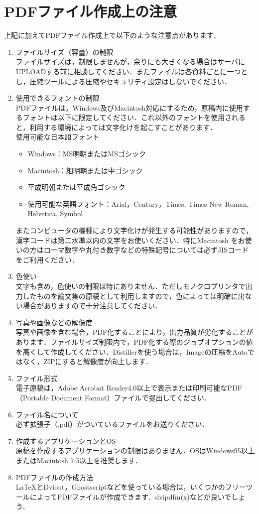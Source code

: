 \documentclass{jsarticle}
\begin{document}
\section{PDFファイル作成上の注意}
上記に加えてPDFファイル作成上で以下のような注意点があります．
\begin{enumerate}
  \item ファイルサイズ（容量）の制限 \\
ファイルサイズは，制限しませんが，余りにも大きくなる場合はサーバにUPLOADする前に相談してください．またファイルは各資料ごとに一つとし，圧縮ツールによる圧縮やセキュリティ設定はしないでください．
  \item 使用できるフォントの制限 \\
PDFファイルは，Windows及びMacintosh対応にするため，原稿内に使用するフォントは以下に限定してください．これ以外のフォントを使用されると，利用する環境によっては文字化けを起こすことがあります．
\\
使用可能な日本語フォント
\begin{itemize}
  \item Windows：MS明朝またはMSゴシック
  \item Macintosh：細明朝または中ゴシック
  \item 平成明朝または平成角ゴシック
  \item 使用可能な英語フォント：Arial，Century，Times, Times New Roman, Helvetica, Symbol
\end{itemize}
またコンピュータの機種により文字化けが発生する可能性がありますので，漢字コードは第二水準以内の文字をお使いください．特にMacintosh をお使いの方はローマ数字や丸付き数字などの特殊記号については必ずJISコードをご利用ください．

  \item 色使い \\
文字も含め，色使いの制限は特にありません．ただしモノクロプリンタで出力したものを論文集の原稿として利用しますので，色によっては明確に出ない場合がありますので十分注意してください．
  \item 写真や画像などの解像度 \\
写真や画像を含む場合，PDF化することにより，出力品質が劣化することがあります．ファイルサイズ制限内で，PDF化する際のジョブオプションの値を高くして作成してください．Distillerを使う場合は，Imageの圧縮をAutoではなく，ZIPにすると解像度が向上します．
  \item ファイル形式 \\
電子原稿は，Adobe Acrobat Reader4.0以上で表示または印刷可能なPDF（Portable Document Format）ファイルで提出してください．
  \item ファイル名について \\
必ず拡張子（.pdf）がついているファイルをお送りください．
  \item 作成するアプリケーションとOS \\
原稿を作成するアプリケーションの制限はありません．OSはWindows95以上またはMacintosh 7.5以上を推奨します．
  \item PDFファイルの作成方法 \\
{\LaTeX}とDviout，Ghostscriptなどを使っている場合は，いくつかのフリーツールによってPDFファイルが作成できます．dvipdfm(x)などが良いでしょう．


\end{enumerate}
\end{document}
